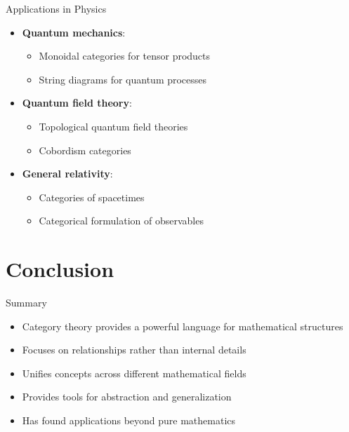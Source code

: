 \documentclass{beamer}
\begin{document}
    \begin{frame}{Applications in Physics}
    \begin{itemize}
        \item \textbf{Quantum mechanics}:
            \begin{itemize}
                \item Monoidal categories for tensor products
                \item String diagrams for quantum processes
            \end{itemize}
        \item \textbf{Quantum field theory}:
            \begin{itemize}
                \item Topological quantum field theories
                \item Cobordism categories
            \end{itemize}
        \item \textbf{General relativity}:
            \begin{itemize}
                \item Categories of spacetimes
                \item Categorical formulation of observables
            \end{itemize}
    \end{itemize}
    \end{frame}
    
    \section{Conclusion}
    
    \begin{frame}{Summary}
    \begin{itemize}
        \item Category theory provides a powerful language for mathematical structures
        \item Focuses on relationships rather than internal details
        \item Unifies concepts across different mathematical fields
        \item Provides tools for abstraction and generalization
        \item Has found applications beyond pure mathematics
    \end{itemize}
    \end{frame}
    
\end{document}
